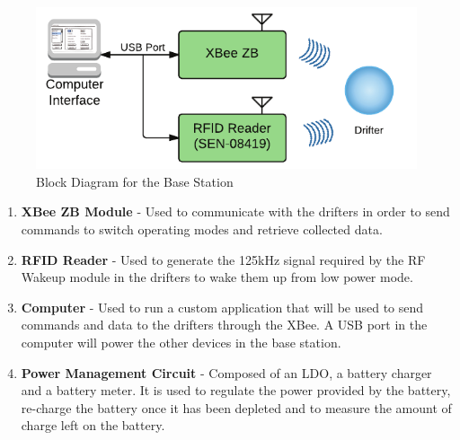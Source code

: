 \begin{figure}[H]
	\centering
	\includegraphics[scale=1]{img/baseBlockDiagram}
	\caption{Block Diagram for the Base Station \label{fig:baseBlockDiagram}}
\end{figure}

\begin{enumerate}
\item \textbf{XBee ZB Module} -  Used to communicate with the drifters in order to send commands to switch operating modes and retrieve collected data.

\item \textbf{RFID Reader} - Used to generate the 125kHz signal required by the RF Wakeup module in the drifters to wake them up from low power mode.

\item \textbf{Computer} - Used to run a custom application that will be used to send commands and data to the drifters through the XBee.  A USB port in the computer will power the other devices in the base station.

\item \textbf{Power Management Circuit} - Composed of an LDO, a battery charger and a battery meter.  It is used to regulate the power provided by the battery, re-charge the battery once it has been depleted and to measure the amount of charge left on the battery.


\end{enumerate}
